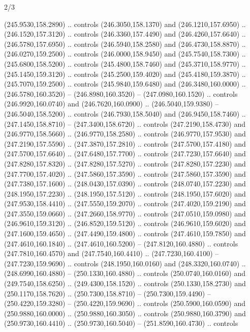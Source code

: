 \begin{flagdescription}{2/3}
\begin{scope}[xshift=0.5\flaglength,yshift=0.5\flagwidth,scale=\flagwidth/259.2]
\begin{scope}[y=0.8pt, x=0.8pt, yscale=-1,shift={(-243,-162)}]
      (245.9530,158.2890) .. controls (246.3050,158.1370) and (246.1210,157.6950) ..
      (246.1520,157.3120) .. controls (246.3360,157.4490) and (246.4260,157.6640) ..
      (246.5780,157.6950) .. controls (246.5940,158.2580) and (246.4730,158.8870) ..
      (246.0270,159.2500) .. controls (246.0000,158.9450) and (245.7540,158.7300) ..
      (245.6800,158.5200) .. controls (245.4800,158.7460) and (245.3710,158.9770) ..
      (245.1450,159.3120) .. controls (245.2500,159.4020) and (245.4180,159.3870) ..
      (245.7070,159.2500) .. controls (245.9840,159.6480) and (246.3480,160.0000) ..
      (246.5780,160.3520) -- (246.8980,160.3520) -- (247.0980,160.1520) .. controls
      (246.9920,160.0740) and (246.7620,160.0900) .. (246.5040,159.9380) --
      (246.5040,158.5200) .. controls (246.7930,158.5040) and (246.9450,158.7460) ..
      (247.1450,158.8710) -- (247.3400,158.6720) .. controls (247.2190,158.4730) and
      (246.9770,158.5660) .. (246.9770,158.2580) .. controls (246.9770,157.9530) and
      (247.2190,157.5590) .. (247.3870,157.2810) .. controls (247.5700,157.4180) and
      (247.5700,157.6640) .. (247.6480,157.7700) .. controls (247.7230,157.6640) and
      (247.8280,157.8320) .. (247.8280,157.5270) .. controls (247.8280,157.2230) and
      (247.7700,157.4020) .. (247.5860,157.3590) .. controls (247.5860,157.3590) and
      (247.7380,157.1600) .. (248.0430,157.0390) .. controls (248.0740,157.2230) and
      (248.1950,157.2230) .. (248.1950,157.5120) .. controls (248.1950,157.6020) and
      (247.9530,158.4410) .. (247.5550,159.2070) .. controls (247.4020,159.2190) and
      (247.3550,159.0660) .. (247.2660,158.9770) .. controls (247.0510,159.0980) and
      (246.9610,159.3120) .. (246.8520,159.5120) .. controls (246.9610,159.6020) and
      (247.1600,159.4650) .. (247.4490,159.4800) .. controls (247.4610,159.7850) and
      (247.4610,160.1840) .. (247.4610,160.5200) -- (247.8120,160.4880) .. controls
      (247.7810,160.4570) and (247.7540,160.4410) .. (247.7230,160.4100) --
      (247.7230,159.9690) .. controls (248.1950,160.0160) and (248.3320,160.0740) ..
      (248.6990,160.4880) -- (250.1330,160.4880) .. controls (250.0740,160.0160) and
      (249.7540,158.6250) .. (249.4300,158.1520) .. controls (250.1330,158.2730) and
      (250.1170,158.7620) .. (250.7300,158.8710) -- (250.7300,159.4490) --
      (250.4220,159.3280) -- (250.4220,159.9690) .. controls (250.5900,160.0590) and
      (250.9880,160.0000) .. (250.9880,160.3050) .. controls (250.9880,160.3790) and
      (250.9730,160.4410) .. (250.9730,160.5040) -- (251.8590,160.4730) .. controls

\end{scope}
\end{scope}
\end{flagdescription}
